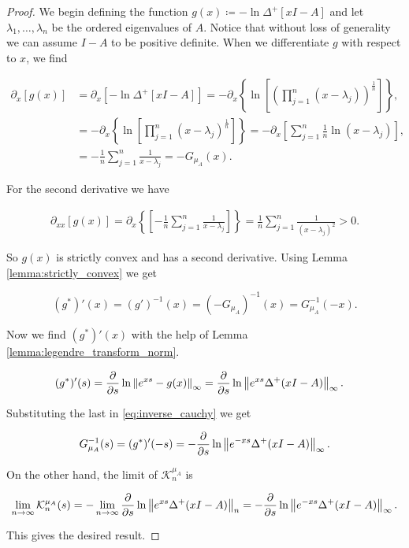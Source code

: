 \begin{proof}
    
    We begin defining the function $g(x) \coloneqq -\ln \Delta^+[xI - A]$ and let $\lambda_1, \dots, \lambda_n$ be the ordered eigenvalues of $A$. Notice that without loss of generality we can assume $I-A$ to be positive definite. When we differentiate $g$ with respect to $x$, we find 

    \begin{align*}
        \partial_x [g(x)] &= \partial_x \left[-\ln \Delta^+[xI - A]\right] = -\partial_x \left\{ \ln\left[ \left(\prod_{j=1}^n (x - \lambda_j) \right)^{\frac1n}\right] \right\}, \\
        &= -\partial_x \left\{\ln \left[ \prod_{j=1}^n (x-\lambda_j)^{\frac1n} \right]\right\} = - \partial_x \left[\sum_{j=1}^n \frac1n \ln (x-\lambda_j)\right],\\ 
        &= -\frac1n \sum_{j=1}^n  \frac1{x-\lambda_j} = - G_{\mu_A}(x).
    \end{align*}

    For the second derivative we have

    \begin{align*}
        \partial_{xx} [g(x)] = \partial_x \left\{\left[ -\frac1n \sum_{j=1}^n  \frac1{x-\lambda_j} \right] \right\}= \frac1n \sum_{j=1}^n \frac{1}{(x-\lambda_j)^2} > 0.
    \end{align*}

    So $g(x)$ is strictly convex and has a second derivative. Using Lemma \ref{lemma:strictly_convex} we get 

    \begin{equation} \label{eq:inverse_cauchy}
        (g^*)'(x) = (g')^{-1}(x) = (-G_{\mu_A})^{-1}(x) = G_{\mu_A}^{-1}(-x).
    \end{equation}

    Now we find $(g^*)'(x)$ with the help of Lemma \ref{lemma:legendre_transform_norm}.

    \begin{align*}
        (g^*)'(s) &= \frac{\partial}{\partial s} \ln \left\lVert e^{xs} - g(x) \right\rVert_\infty = \frac{\partial}{\partial s} \ln \left\lVert e^{xs} \Delta^+(xI - A) \right\rVert_\infty.
    \end{align*}

    Substituting the last in \eqref{eq:inverse_cauchy} we get 

    \begin{equation*}
        G_{\mu_A}^{-1}(s) = (g^*)'(-s) = -\frac{\partial}{\partial s} \ln \left\lVert e^{-xs} \Delta^+(xI - A) \right\rVert_\infty.
    \end{equation*}

    On the other hand, the limit of $\mathcal K_n^{\mu_A}$ is 

    \begin{equation*}
        \lim_{n\to\infty}  \mathcal K_n^{\mu_A}(s) = - \lim_{n\to\infty} \frac{\partial}{\partial s} \ln \left\lVert e^{xs}\Delta^+(xI - A) \right\rVert_n =  -\frac{\partial}{\partial s} \ln \left\lVert e^{-xs} \Delta^+(xI - A) \right\rVert_\infty.
    \end{equation*}

    This gives the desired result.
\end{proof}


